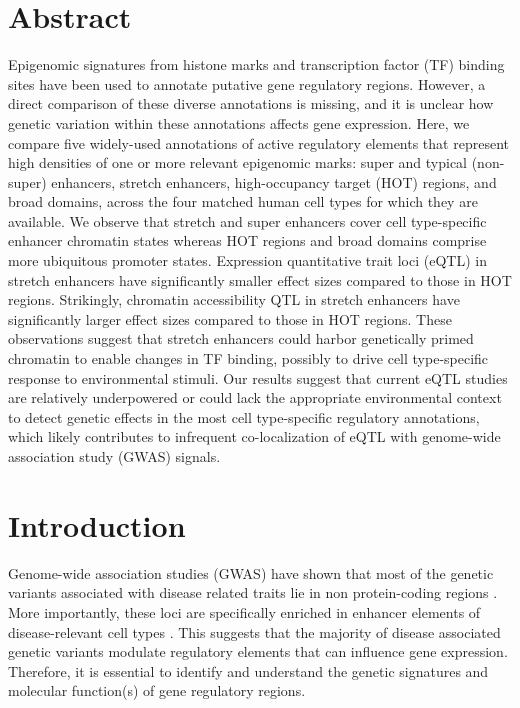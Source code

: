 \section{Abstract}
Epigenomic signatures from histone marks and transcription factor (TF) binding sites have been used to annotate putative gene regulatory regions. However, a direct comparison of these diverse annotations is missing, and it is unclear how genetic variation within these annotations affects gene expression. Here, we compare five widely-used annotations of active regulatory elements that represent high densities of one or more relevant epigenomic marks: super and typical (non-super) enhancers, stretch enhancers, high-occupancy target (HOT) regions, and broad domains, across the four matched human cell types for which they are available. We observe that stretch and super enhancers cover cell type-specific enhancer chromatin states whereas HOT regions and broad domains comprise more ubiquitous promoter states. Expression quantitative trait loci (eQTL) in stretch enhancers have significantly smaller effect sizes compared to those in HOT regions. Strikingly, chromatin accessibility QTL in stretch enhancers have significantly larger effect sizes compared to those in HOT regions. These observations suggest that stretch enhancers could harbor genetically primed chromatin to enable changes in TF binding, possibly to drive cell type-specific response to environmental stimuli. Our results suggest that current eQTL studies are relatively underpowered or could lack the appropriate environmental context to detect genetic effects in the most cell type-specific regulatory annotations, which likely contributes to infrequent co-localization of eQTL with genome-wide association study (GWAS) signals.

\section{Introduction}
Genome-wide association studies (GWAS) have shown that most of the genetic variants associated with disease related traits lie in non protein-coding regions \cite{hindorffPotentialEtiologicFunctional2009}. More importantly, these loci are specifically enriched in enhancer elements of disease-relevant cell types \cite{theencodeprojectconsortiumIntegratedEncyclopediaDNA2012, mauranoSystematicLocalizationCommon2012, trynkaChromatinMarksIdentify2013, parkerChromatinStretchEnhancer2013, corradinCombinatorialEffectsMultiple2014,pasqualiPancreaticIsletEnhancer2014, quangMotifSignaturesStretch2015}. This suggests that the majority of disease associated genetic variants modulate regulatory elements that can influence gene expression. Therefore, it is essential to identify and understand the genetic signatures and molecular function(s) of gene regulatory regions. \\

